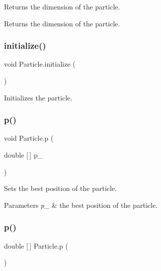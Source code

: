 Returns the dimension of the particle. \begin{DoxyReturn}{Returns}
the dimension of the particle. 
\end{DoxyReturn}
\mbox{\label{class_particle_a99f82d52c6e3e0454db2607f768f8cb3}} 
\subsubsection{\texorpdfstring{initialize()}{initialize()}}
{\footnotesize\ttfamily void Particle.\+initialize (\begin{DoxyParamCaption}{ }\end{DoxyParamCaption})}

Initializes the particle. \mbox{\label{class_particle_a400de2dff42fa47320ab321366842ff1}} 
\subsubsection{\texorpdfstring{p()}{p()}\hspace{0.1cm}{\footnotesize\ttfamily [1/3]}}
{\footnotesize\ttfamily void Particle.\+p (\begin{DoxyParamCaption}\item[{double \mbox{[}$\,$\mbox{]}}]{p\+\_\+ }\end{DoxyParamCaption})}

Sets the best position of the particle. 
\begin{DoxyParams}{Parameters}
{\em p\+\_\+} & the best position of the particle. \\
\hline
\end{DoxyParams}
\mbox{\label{class_particle_add309fe038f8b01ffd812fd574dfeed9}} 
\subsubsection{\texorpdfstring{p()}{p()}\hspace{0.1cm}{\footnotesize\ttfamily [2/3]}}
{\footnotesize\ttfamily double \mbox{[}$\,$\mbox{]} Particle.\+p (\begin{DoxyParamCaption}{ }\end{DoxyParamCaption})}

